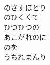 \documentclass[10pt,b5j]{tarticle} %
\begin{document}
\begin{enumerate}
\begin{minipage}[c]{\blocksize}
    \end{minipage}
    \begin{minipage}[c]{\blocksize}
        
        \vspace{\linespace}
        \item~\\
        のさすほとり\\
        のひくくて\\
        ひつひつの\\
        あこがれのに\\
        のを\\
        うちれまんり
    
    \end{minipage}
\end{enumerate} %
\end{document}
